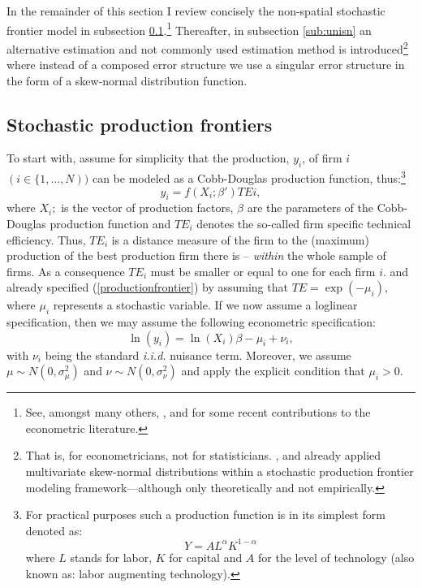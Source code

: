 \documentclass[11pt,parskip,abstracton,notitlepage]{scrartcl}
\begin{document}
In the remainder of this section I review concisely the non-spatial stochastic frontier model in subsection \ref{sub:spf}.\footnote{See, amongst many others, \cite{KUMBHAKAR2000}, \cite{KUMBHAKAR2006, WANG2009} and \cite{WANG2010} for some recent contributions to the econometric literature.} Thereafter, in subsection \ref{sub:unisn} an alternative estimation and not commonly used estimation method is introduced\footnote{That is, for econometricians, not for statisticians. \citet{molina2003skew}, \citet{gupta2004multivariate} and \citet{dominguez2007matrix} already applied multivariate skew-normal distributions within a stochastic production frontier modeling framework---although only theoretically and not empirically. } where instead of a composed error structure we use a singular error structure in the form of a skew-normal distribution function. 
%
\subsection{Stochastic production frontiers}\label{sub:spf}
%
To start with, assume for simplicity that the production, $y_i$, of firm $i$ $(i \in \{1,\ldots,N))$ can be modeled as a Cobb-Douglas production function, thus:\footnote{For practical purposes such a production function is in its simplest form denoted as:\begin{equation*} Y = AL^\alpha K^{1-\alpha}\end{equation*} where $L$ stands for labor, $K$ for capital and $A$ for the level of technology (also known as: labor augmenting technology).} 
%
\begin{equation}
y_i = f(X_i;\beta'){TE}{i},
\label{productionfrontier}
\end{equation}
%
where $X_i;$ is the vector of production factors, $\beta$ are the parameters of the Cobb-Douglas production function and ${TE}_i$ denotes the so-called firm specific technical efficiency. Thus, ${TE}_i$ is a distance measure of the firm to the (maximum) production of the best production firm there is -- \emph{within} the whole sample of firms. As a consequence ${TE}_i$ must be smaller or equal to one for each firm $i$.
%
\citet{AIGNER1977} and \citet{MEEUSEN1977} already specified (\ref{productionfrontier}) by assuming that $TE = \exp(-\mu_i)$, where $\mu_i$ represents a stochastic variable. If we now assume a loglinear specification, then we may assume the following econometric specification:
%
\begin{equation}
\ln \left(y_i\right) = \ln({X}_i) \beta - \mu_i + \nu_i,
\label{specification}
\end{equation}
%
with $\nu_i$ being the standard \emph{i.i.d.} nuisance term. Moreover, we assume $\mu\sim N(0,\sigma^2_\mu)$ and $\nu \sim N(0,\sigma^2_\nu)$ and apply the explicit condition that $\mu_i > 0$. 
\end{document}
